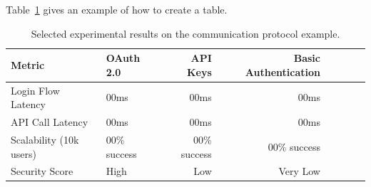 Table~\ref{tab:results} gives an example of how to create a table.

\begin{table}[bth]
	\centering
	\begin{tabular}{llrrrrrr}
		Metric & OAuth 2.0 & API Keys& Basic Authentication
		\\ \hline \hline
		Login Flow Latency & 00ms   &   00ms  &   00ms \\
		API Call Latency & 00ms   &   00ms  &   00ms \\
		Scalability (10k users) & 00\% success   & 00\% success  &  00\% success \\
		Security Score & High   &   Low  &   Very Low \\
		\hline \hline
	\end{tabular}
	\caption{Selected experimental results on the communication protocol example.}
	\label{tab:results}
\end{table}
